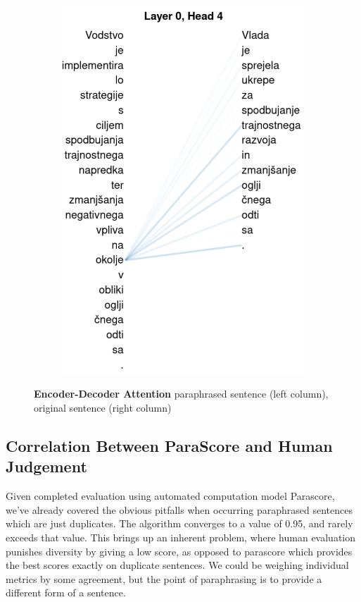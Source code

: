 \documentclass[fleqn,moreauthors,10pt]{ds_report}
\begin{document}
\begin{figure}[ht]
\begin{subfigure}{0.45\linewidth}
        \includegraphics[width=\textwidth]{report/fig/t5-sen1-conn2.pdf}
        \label{fig:t5-sen1-conn2}
    \end{subfigure}
    \caption{\textbf{Encoder-Decoder Attention} paraphrased sentence (left column), original sentence (right column)}
    \label{fig:t5-sen1-cross-attention}
\end{figure}



\subsection{Correlation Between ParaScore and Human Judgement}

Given completed evaluation using automated computation model Parascore, we've already covered the obvious pitfalls when occurring paraphrased sentences which are just duplicates. The algorithm converges to a value of 0.95, and rarely exceeds that value. This brings up an inherent problem, where human evaluation punishes diversity by giving a low score, as opposed to parascore which provides the best scores exactly on duplicate sentences. We could be weighing individual metrics by some agreement, but the point of paraphrasing is to provide a different form of a sentence.
\end{document}
